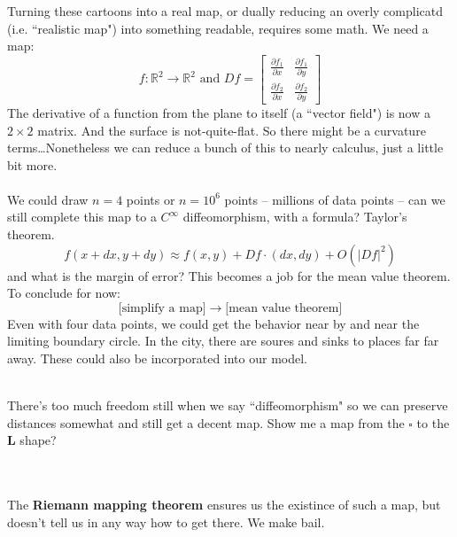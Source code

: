 \documentclass[12pt]{article}
\begin{document}
Turning these cartoons into a real map, or dually reducing an overly complicatd (i.e. ``realistic map") into something readable, requires some math.  We need a map:
$$ f: \mathbb{R}^2 \to \mathbb{R}^2 \text{ and } Df = \left[ \begin{array}{cc}
\frac{\partial f_1}{\partial x} & \frac{\partial f_1}{\partial y}  \\ 
\frac{\partial f_2}{\partial x} & \frac{\partial f_2}{\partial y}  \end{array} \right] $$
The derivative of a function from the plane to itself (a ``vector field") is now a $2 \times 2$ matrix.  And the surface is not-quite-flat.  So there might be a curvature terms\dots Nonetheless we can reduce a bunch of this to nearly calculus, just a little bit more. \\ \\ 
We could draw $n = 4$ points or $n = 10^6$ points -- millions of data points -- can we still complete this map to a $C^\infty$ diffeomorphism, with a formula?  Taylor's theorem.
$$ f(x + dx, y+dy) \approx f(x,y) +  Df \cdot (dx,dy)  + O(|Df|^2)$$
and what is the margin of error?  This becomes a job for the mean value theorem.  To conclude for now:
$$ \big[\text{simplify a map}\big] \to \big[\text{mean value theorem}\big] $$
Even with four data points, we could get the behavior near by and near the limiting boundary circle.  In the city, there are soures and sinks to places far far away.  These could also be incorporated into our model.  \\ \\
\begin{minipage}{0.5\textwidth}
\end{minipage}
\begin{minipage}{0.5\textwidth}
There's too much freedom still when we say ``diffeomorphism" so we can preserve distances somewhat and still get a decent map.  Show me a map from the $\square$ to the $\textbf{L}$ shape?
\end{minipage} \\ \\
\noindent The \textbf{Riemann mapping theorem} ensures us the existince of such a map, but doesn't tell us in any way how to get there.  We make bail.
\vfill
\end{document}
